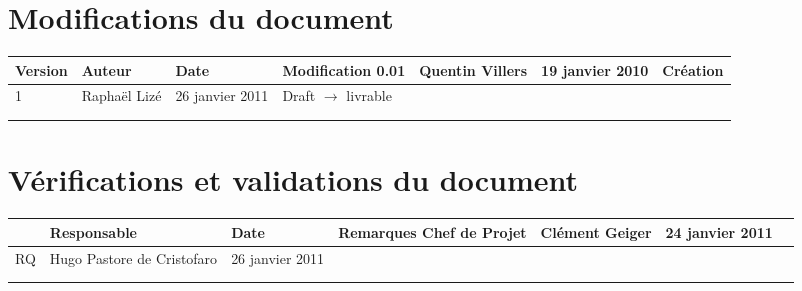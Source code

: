 
\section*{Modifications du document}

\begin{center}
\begin{longtable}{|m{14mm}|m{36mm}|m{36mm}|m{60mm}|}
\hline
Version & Auteur & Date & Modification\endhead \hline
0.01
& %
Quentin Villers
& %
19 janvier 2010
& %
Création
\\\hline
1
& %
Raphaël Lizé
& %
26 janvier 2011
& %
Draft $\rightarrow$ livrable
\\\hline

& %

& %

& %

\\\hline

& %

& %

& %

\\\hline
\end{longtable}
\end{center}


\section*{Vérifications et validations du document}

\begin{center}
\begin{longtable}{|m{15mm}|m{36mm}|m{36mm}|m{60mm}|}
\hline
 & Responsable & Date & Remarques\endhead \hline
Chef de Projet
& %
Clément Geiger
& %
24 janvier 2011
& %

\\\hline
RQ
& %
Hugo Pastore de Cristofaro
& %
26 janvier 2011
& %
\\\hline

& %

& %

& %

\\\hline

& %

& %

& %

\\\hline
\end{longtable}
\end{center}

\pagebreak
